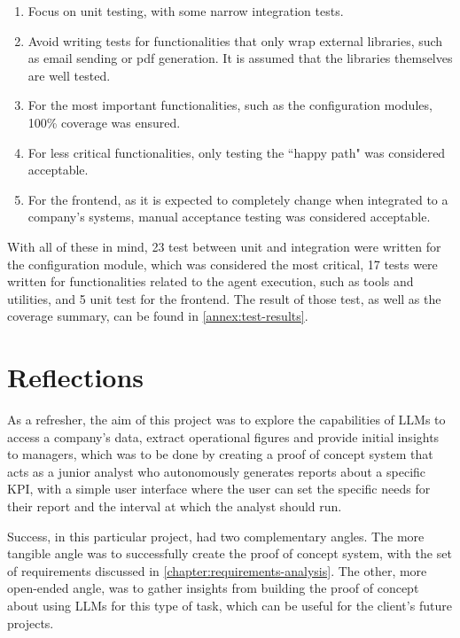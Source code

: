 \documentclass[a4paper]{report}
\begin{document}
\begin{enumerate}
    \item Focus on unit testing, with some narrow integration tests.
    \item Avoid writing tests for functionalities that only wrap external libraries, such as email sending or pdf generation. It is assumed that the libraries themselves are well tested.
    \item For the most important functionalities, such as the configuration modules, 100\% coverage was ensured.
    \item For less critical functionalities, only testing the ``happy path" was considered acceptable.
    \item For the frontend, as it is expected to completely change when integrated to a company's systems, manual acceptance testing was considered acceptable.
\end{enumerate}

With all of these in mind, 23 test between unit and integration were written for the configuration module, which was considered the most critical, 17 tests were written for functionalities related to the agent execution, such as tools and utilities, and 5 unit test for the frontend. The result of those test, as well as the coverage summary, can be found in \autoref{annex:test-results}.

\chapter{Reflections}
\label{chapter:reflections}

As a refresher, the aim of this project was to explore the capabilities of LLMs to access a company's data, extract operational figures and provide initial insights to managers, which was to be done by creating a proof of concept system that acts as a junior analyst who autonomously generates reports about a specific KPI, with a simple user interface where the user can set the specific needs for their report and the interval at which the analyst should run.

Success, in this particular project, had two complementary angles. The more tangible angle was to successfully create the proof of concept system, with the set of requirements discussed in \autoref{chapter:requirements-analysis}. The other, more open-ended angle, was to gather insights from building the proof of concept about using LLMs for this type of task, which can be useful for the client's future projects.
\end{document}
